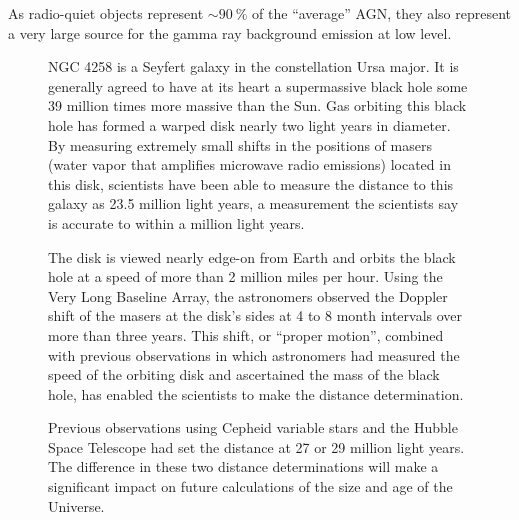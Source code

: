 \documentclass[10pt,a4paper,english]{article}
\begin{document}
As radio-quiet objects represent $\sim \SI{90}{\percent}$ of the “average” AGN,
they also represent a very large source for the gamma ray background emission
at low level.

\begin{figure}[!ht]
    \noindent
    \begin{minipage}{.49\textwidth}

        NGC 4258 is a Seyfert galaxy in the constellation Ursa major. It is
        generally agreed to have at its heart a supermassive black hole some
        39 million times more massive than the Sun. Gas orbiting this black
        hole has formed a warped disk nearly two light years in diameter. By
        measuring extremely small shifts in the positions of  masers
        (water vapor that amplifies microwave radio emissions) located in this
        disk, scientists have been able to measure the distance to this galaxy
        as 23.5 million light years, a measurement the scientists say is
        accurate to within a million light years.

        The disk is viewed nearly edge-on from Earth and orbits the black hole
        at a speed of more than 2 million miles per hour. Using the Very Long
        Baseline Array, the astronomers observed the Doppler shift of the
        masers at the disk's sides at 4 to 8 month intervals over more than
        three years. This shift, or “proper motion”, combined with previous
        observations in which astronomers had measured the speed of the
        orbiting disk and ascertained the mass of the black hole, has enabled
        the scientists to make the distance determination.

        Previous observations using Cepheid variable stars and the Hubble Space
        Telescope had set the distance at 27 or 29 million light years. The
        difference in these two distance determinations will make a significant
        impact on future calculations of the size and age of the Universe.


\end{minipage}
\end{figure}
\end{document}
